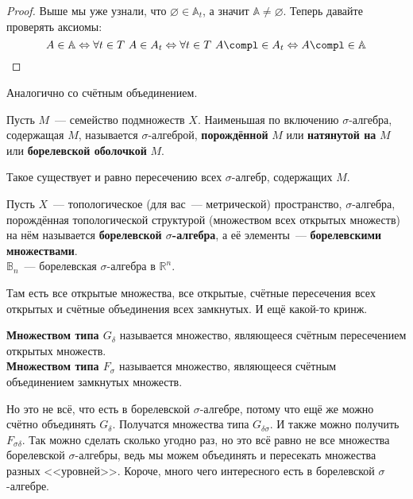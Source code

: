 \documentclass{article}
\begin{document}
    \begin{proof}
        Выше мы уже узнали, что $\varnothing\in\mathbb A_t$, а значит $\mathbb A\neq\varnothing$. Теперь давайте проверять аксиомы:
        $$
        A\in\mathbb A\Leftrightarrow\forall t\in T~A\in A_t\Leftrightarrow\forall t\in T~A\compl\in A_t\Leftrightarrow A\compl\in\mathbb A
        $$
    \end{proof}
    \begin{remark}
        Аналогично со счётным объединением.
    \end{remark}
    \begin{definition}
        Пусть $M$~--- семейство подмножеств $X$. Наименьшая по включению $\sigma$-алгебра, содержащая $M$, называется $\sigma$-алгеброй, \textbf{порождённой} $M$ или \textbf{натянутой на} $M$ или \textbf{борелевской оболочкой} $M$.
    \end{definition}
    \begin{remark}
        Такое существует и равно пересечению всех $\sigma$-алгебр, содержащих $M$.
    \end{remark}
    \begin{definition}
        Пусть $X$~--- топологическое (для вас~--- метрической) пространство, $\sigma$-алгебра, порождённая топологической структурой (множеством всех открытых множеств) на нём называется \textbf{борелевской $\sigma$-алгебра}, а её элементы~--- \textbf{борелевскими множествами}.\\
        $\mathbb B_n$~--- борелевская $\sigma$-алгебра в $\mathbb R^n$.
    \end{definition}
    \begin{property}
        Там есть все открытые множества, все открытые, счётные пересечения всех открытых и счётные объединения всех замкнутых. И ещё какой-то кринж.
    \end{property}
    \begin{definition}
        \textbf{Множеством типа $G_\delta$} называется множество, являющееся счётным пересечением открытых множеств.\\
        \textbf{Множеством типа $F_\sigma$} называется множество, являющееся счётным объединением замкнутых множеств.
    \end{definition}
    \begin{remark}
        Но это не всё, что есть в борелевской $\sigma$-алгебре, потому что ещё же можно счётно объединять $G_\delta$. Получатся множества типа $G_{\delta\sigma}$. И также можно получить $F_{\sigma\delta}$. Так можно сделать сколько угодно раз, но это всё равно не все множества борелевской $\sigma$-алгебры, ведь мы можем объединять и пересекать множества разных <<уровней>>. Короче, много чего интересного есть в борелевской $\sigma$-алгебре.
    \end{remark}
\end{document}
